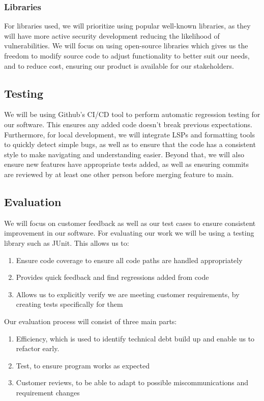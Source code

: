 \subsubsection{Libraries}
For libraries used, we will prioritize using popular well-known libraries, as they will have more
active security development reducing the likelihood of vulnerabilities. We will focus on using
open-source libraries which gives us the freedom to modify source code to adjust functionality to
better suit our needs, and to reduce cost, ensuring our product is available for our stakeholders.

\subsection{Testing}
We will be using Github's CI/CD tool to perform automatic regression testing for our software.
This ensures any added code doesn't break previous expectations.
Furthermore, for local development, we will integrate LSPs and formatting tools to quickly detect
simple bugs, as well as to ensure that the code has a consistent style to make navigating and understanding easier.
Beyond that, we will also ensure new features have appropriate tests added, as well as ensuring commits are
reviewed by at least one other person before merging feature to main.

\par
\subsection{Evaluation}
We will focus on customer feedback as well as our test cases to ensure consistent improvement in our software.
For evaluating our work we will be using a testing library such as JUnit. This allows us to:\\
\begin{enumerate}
\item Ensure code coverage to ensure all code paths are handled appropriately
\item Provides quick feedback and find regressions added from code
\item Allows us to explicitly verify we are meeting customer requirements, by creating tests specifically for them
\end{enumerate}

\par
Our evaluation process will consist of three main parts:

\begin{enumerate}
\item Efficiency, which is used to identify technical debt build up and enable us to refactor early.
\item Test, to ensure program works as expected
\item Customer reviews, to be able to adapt to possible miscommunications and requirement changes
\end{enumerate}


